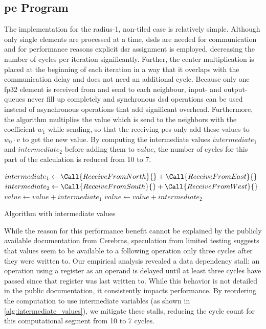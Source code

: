 \subsection{\ac{pe} Program}
The implementation for the radius-1, non-tiled case is relatively simple.
Although only single elements are processed at a time, \acp{dsd} are needed for communication and for performance reasons explicit \ac{dsr} assignment is employed, decreasing the number of cycles per iteration significantly.  
Further, the center multiplication is placed at the beginning of each iteration in a way that it overlaps with the communication delay and does not need an additional cycle.
Because only one fp32 element is received from and send to each neighbour, input- and output- queues never fill up completely and synchronous \ac{dsd} operations can be used instead of asynchronous operations that add significant overhead.
Furthermore, the algorithm multiplies the value which is send to the neighbors with the coefficient $w_1$ while sending, so that the receiving \acp{pe} only add these values to $w_0 \cdot v$ to get the new value.
By computing the intermediate values $intermediate_1$ and $intermediate_2$ before adding them to $value$, the number of cycles for this part of the calculation is reduced from 10 to 7.

\begin{algorithm}[tbh]
    \SetAlgoLined
    $intermediate_1 \gets \Call{ReceiveFromNorth}{} + \Call{ReceiveFromEast}{}$\;
    $intermediate_2 \gets \Call{ReceiveFromSouth}{} + \Call{ReceiveFromWest}{}$\;
    $value \gets value + intermediate_1$\;
    $value \gets value + intermediate_2$\;
    \caption{Algorithm with intermediate values}\label{alg:intermediate_values}
\end{algorithm}

While the reason for this performance benefit cannot be explained by the publicly available documentation from Cerebras, speculation from limited testing suggests that values seem to be available to a following operation only three cycles after they were written to.
Our empirical analysis revealed a data dependency stall: an operation using a register as an operand is delayed until at least three cycles have passed since that register was last written to. While this behavior is not detailed in the public documentation, it consistently impacts performance. By reordering the computation to use intermediate variables (as shown in \autoref{alg:intermediate_values}), we mitigate these stalls, reducing the cycle count for this computational segment from 10 to 7 cycles.

